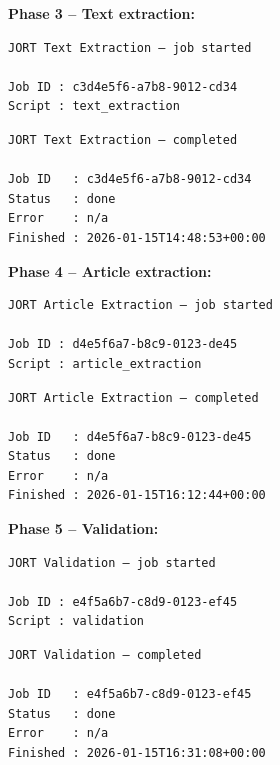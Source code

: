 \vspace{0.8em}
\noindent\textbf{Phase 3 -- Text extraction:}

\vspace{0.3em}
\noindent
\begin{minipage}[t]{0.48\textwidth}
\small
\begin{verbatim}
JORT Text Extraction — job started

Job ID : c3d4e5f6-a7b8-9012-cd34
Script : text_extraction
\end{verbatim}
\end{minipage}
\hfill
\begin{minipage}[t]{0.48\textwidth}
\small
\begin{verbatim}
JORT Text Extraction — completed

Job ID   : c3d4e5f6-a7b8-9012-cd34
Status   : done
Error    : n/a
Finished : 2026-01-15T14:48:53+00:00
\end{verbatim}
\end{minipage}

\vspace{0.8em}
\noindent\textbf{Phase 4 -- Article extraction:}

\vspace{0.3em}
\noindent
\begin{minipage}[t]{0.48\textwidth}
\small
\begin{verbatim}
JORT Article Extraction — job started

Job ID : d4e5f6a7-b8c9-0123-de45
Script : article_extraction
\end{verbatim}
\end{minipage}
\hfill
\begin{minipage}[t]{0.48\textwidth}
\small
\begin{verbatim}
JORT Article Extraction — completed

Job ID   : d4e5f6a7-b8c9-0123-de45
Status   : done
Error    : n/a
Finished : 2026-01-15T16:12:44+00:00
\end{verbatim}
\end{minipage}

\vspace{0.8em}
\noindent\textbf{Phase 5 -- Validation:}

\vspace{0.3em}
\noindent
\begin{minipage}[t]{0.48\textwidth}
\small
\begin{verbatim}
JORT Validation — job started

Job ID : e4f5a6b7-c8d9-0123-ef45
Script : validation
\end{verbatim}
\end{minipage}
\hfill
\begin{minipage}[t]{0.48\textwidth}
\small
\begin{verbatim}
JORT Validation — completed

Job ID   : e4f5a6b7-c8d9-0123-ef45
Status   : done
Error    : n/a
Finished : 2026-01-15T16:31:08+00:00
\end{verbatim}
\end{minipage}

